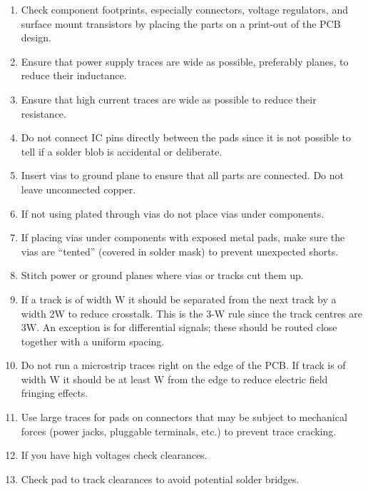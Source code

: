 \begin{enumerate}
\item Check component footprints, especially connectors, voltage
  regulators, and surface mount transistors by placing the parts on a
  print-out of the PCB design.

\item Ensure that power supply traces are wide as possible, preferably
  planes, to reduce their inductance.

\item Ensure that high current traces are wide as possible to reduce their resistance.

\item Do not connect IC pins directly between the pads since it is not
  possible to tell if a solder blob is accidental or deliberate.

\item Insert vias to ground plane to ensure that all parts are connected.  Do not leave unconnected copper.

\item If not using plated through vias do not place vias under
  components.

\item If placing vias under components with exposed metal pads, make
  sure the vias are ``tented'' (covered in solder mask) to prevent
  unexpected shorts.

\item Stitch power or ground planes where vias or tracks cut them up.

\item If a track is of width W it should be separated from the next
  track by a width 2W to reduce crosstalk.  This is the 3-W rule since
  the track centres are 3W.  An exception is for differential signals;
  these should be routed close together with a uniform spacing.

\item Do not run a microstrip traces right on the edge of the PCB.  If
  track is of width W it should be at least W from the edge to reduce
  electric field fringing effects.

\item Use large traces for pads on connectors that may be subject to
  mechanical forces (power jacks, pluggable terminals, etc.) to
  prevent trace cracking.

\item If you have high voltages check clearances.

\item Check pad to track clearances to avoid potential solder bridges.


\end{enumerate}
